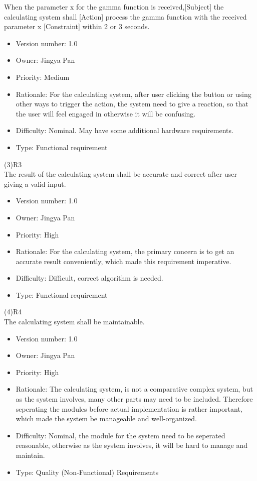 \documentclass[a4paper, 11pt]{article}
\begin{document}
\indent When the parameter x for the gamma function is received,[Subject] the calculating system shall [Action] process the gamma function with the received parameter x [Constraint] within  2 or 3 seconds. 

\begin{itemize}
    \item Version number: 1.0
    \item Owner: Jingya Pan
    \item Priority: Medium
    \item Rationale: For the calculating system, after user clicking the button or using other ways to trigger the action, the system need to give a reaction, so that the user will feel engaged in otherwise it will be confusing.
    \item Difficulty: Nominal. May have some additional hardware requirements.
    \item Type: Functional requirement
\end{itemize}
(3)R3\\
\indent The result of the calculating system shall be accurate and correct after user giving a valid input.

\begin{itemize}
    \item Version number: 1.0
    \item Owner: Jingya Pan
    \item Priority: High
    \item Rationale: For the calculating system, the primary concern is to get an accurate result conveniently, which made this requirement imperative.
    \item Difficulty: Difficult, correct algorithm is needed.
    \item Type: Functional requirement
\end{itemize}
(4)R4\\
\indent The calculating system shall be maintainable.

\begin{itemize}
    \item Version number: 1.0
    \item Owner: Jingya Pan
    \item Priority: High
    \item Rationale: The calculating system, is not a comparative complex system, but as the system involves, many other parts may need to be included. Therefore seperating the modules before actual implementation is rather important, which made the system be manageable and well-organized.
    \item Difficulty: Nominal, the module for the system need to be seperated reasonable, otherwise as the system involves, it will be hard to manage and maintain.
    \item Type: Quality (Non-Functional) Requirements
\end{itemize}
\pagebreak
\end{document}
